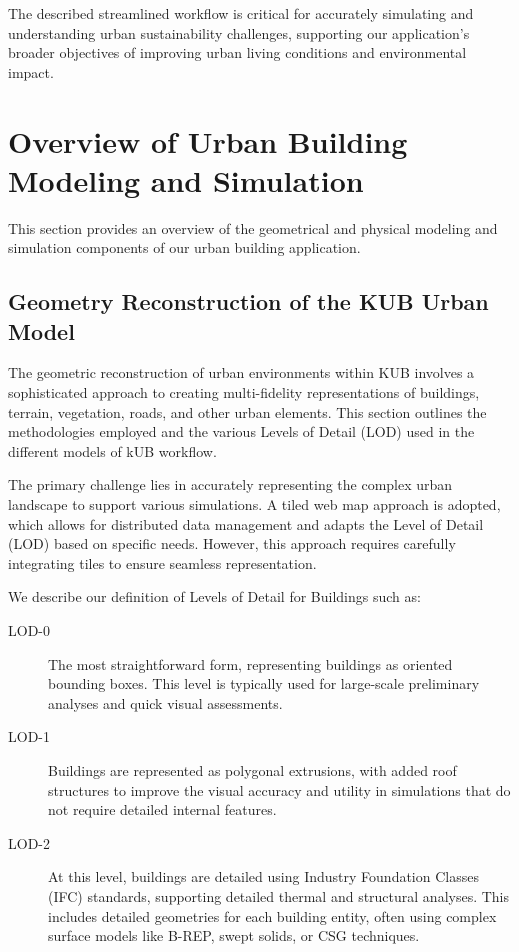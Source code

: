 \documentclass[runningheads]{llncs}
\begin{document}
The described streamlined workflow is critical for accurately simulating and understanding urban sustainability challenges, supporting our application's broader objectives of improving urban living conditions and environmental impact.


\section{Overview of Urban Building Modeling and Simulation}
\label{sec:urban-building}

This section provides an overview of the geometrical and physical modeling and simulation components of our urban building application.

\subsection{Geometry Reconstruction of the KUB Urban Model}

The geometric reconstruction of urban environments within KUB involves a sophisticated approach to creating multi-fidelity representations of buildings, terrain, vegetation, roads, and other urban elements. This section outlines the methodologies employed and the various Levels of Detail (LOD) used in the different models of kUB workflow.


The primary challenge lies in accurately representing the complex urban landscape to support various simulations. A tiled web map approach is adopted, which allows for distributed data management and adapts the Level of Detail (LOD) based on specific needs. However, this approach requires carefully integrating tiles to ensure seamless representation.


We describe our definition of Levels of Detail for Buildings such as:
\begin{description}
    \item[LOD-0] The most straightforward form, representing buildings as oriented bounding boxes. This level is typically used for large-scale preliminary analyses and quick visual assessments.
    \item[LOD-1] Buildings are represented as polygonal extrusions, with added roof structures to improve the visual accuracy and utility in simulations that do not require detailed internal features.
    \item[LOD-2] At this level, buildings are detailed using Industry Foundation Classes (IFC) standards, supporting detailed thermal and structural analyses. This includes detailed geometries for each building entity, often using complex surface models like B-REP, swept solids, or CSG techniques.
\end{description}
\end{document}
